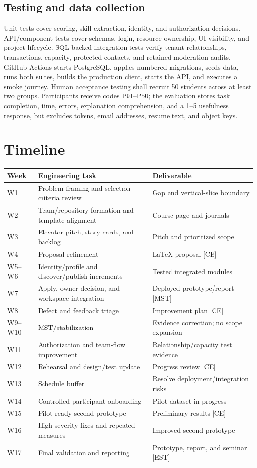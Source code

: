 \documentclass[11pt,a4paper]{article}
\begin{document}
\subsection{Testing and data collection}

Unit tests cover scoring, skill extraction, identity, and authorization decisions. API/component tests cover schemas, login, resource ownership, UI visibility, and project lifecycle. SQL-backed integration tests verify tenant relationships, transactions, capacity, protected contacts, and retained moderation audits. GitHub Actions starts PostgreSQL, applies numbered migrations, seeds data, runs both suites, builds the production client, starts the API, and executes a smoke journey. Human acceptance testing shall recruit 50 students across at least two groups. Participants receive codes P01--P50; the evaluation stores task completion, time, errors, explanation comprehension, and a 1--5 usefulness response, but excludes tokens, email addresses, resume text, and object keys.

\section{Timeline}

\small
\begin{tabularx}{\textwidth}{@{}lXl@{}}
\toprule
Week & Engineering task & Deliverable \\
\midrule
W1 & Problem framing and selection-criteria review & Gap and vertical-slice boundary \\
W2 & Team/repository formation and template alignment & Course page and journals \\
W3 & Elevator pitch, story cards, and backlog & Pitch and prioritized scope \\
W4 & Proposal refinement & LaTeX proposal [CE] \\
W5--W6 & Identity/profile and discover/publish increments & Tested integrated modules \\
W7 & Apply, owner decision, and workspace integration & Deployed prototype/report [MST] \\
W8 & Defect and feedback triage & Improvement plan [CE] \\
W9--W10 & MST/stabilization & Evidence correction; no scope expansion \\
W11 & Authorization and team-flow improvement & Relationship/capacity test evidence \\
W12 & Rehearsal and design/test update & Progress review [CE] \\
W13 & Schedule buffer & Resolve deployment/integration risks \\
W14 & Controlled participant onboarding & Pilot dataset in progress \\
W15 & Pilot-ready second prototype & Preliminary results [CE] \\
W16 & High-severity fixes and repeated measures & Improved second prototype \\
W17 & Final validation and reporting & Prototype, report, and seminar [EST] \\
\bottomrule
\end{tabularx}
\normalsize
\end{document}
